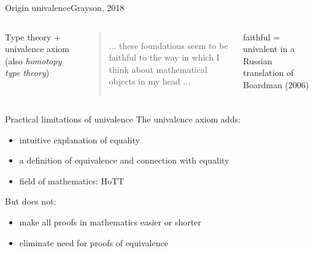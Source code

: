 \documentclass[english,handout]{beamer}
\begin{document}
\begin{frame}{Origin univalence}{Grayson, 2018}
\begin{columns}[c]
    \begin{definition}
     Type theory + univalence axiom (also \emph{homotopy type theory})
    \end{definition}


        \pause

        \begin{quotation}
        ... these foundations seem to be faithful to the way in which I think about mathematical objects in my head ...
        \end{quotation}

        faithful = univalent in a Russian translation of Boardman (2006)

\end{columns}
\end{frame}

\begin{frame}{Practical limitations of univalence}
The univalence axiom adds:
\begin{itemize}
    \item intuitive explanation of equality
    \item a definition of equivalence and connection with equality
    \item field of mathematics: HoTT
\end{itemize}

But does not:
\begin{itemize}
    \item make all proofs in mathematics easier or shorter
    \item eliminate need for proofs of equivalence
\end{itemize}




\end{frame}
\end{document}
